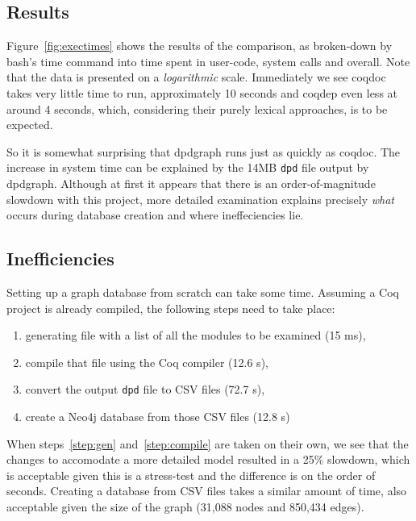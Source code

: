 \subsection{Results}

Figure~\ref{fig:exectimes} shows the results of the comparison, as broken-down
by bash's time command into time spent in user-code, system calls and overall.
Note that the data is presented on a \emph{logarithmic} scale. Immediately
we see coqdoc takes very little time to run, approximately 10 seconds and coqdep
even less at around 4 seconds, which, considering their purely lexical
approaches, is to be expected.

So it is somewhat surprising that dpdgraph runs just as quickly as coqdoc. The
increase in system time can be explained by the 14MB \texttt{dpd} file output by
dpdgraph. Although at first it appears that there is an order-of-magnitude
slowdown with this project, more detailed examination explains precisely
\emph{what} occurs during database creation and where ineffeciencies lie.

\subsection{Inefficiencies}

Setting up a graph database from scratch can take some time. Assuming a Coq
project is already compiled, the following steps need to take place:

\begin{enumerate}
  \item\label{step:gen} generating file with a list of all the modules to be
    examined (15 ms),
  \item\label{step:compile} compile that file using the Coq compiler (12.6 s),
  \item\label{step:dpd2csv} convert the output \texttt{dpd} file to CSV files (72.7 s),
  \item create a Neo4j database from those CSV files (12.8 s)
\end{enumerate}

When steps~\ref{step:gen} and~\ref{step:compile} are taken on their own, we see
that the changes to accomodate a more detailed model resulted in a 25\%
slowdown, which is acceptable given this is a stress-test and the difference is
on the order of seconds. Creating a database from CSV files takes a similar
amount of time, also acceptable given the size of the graph (31,088 nodes and
850,434 edges).

